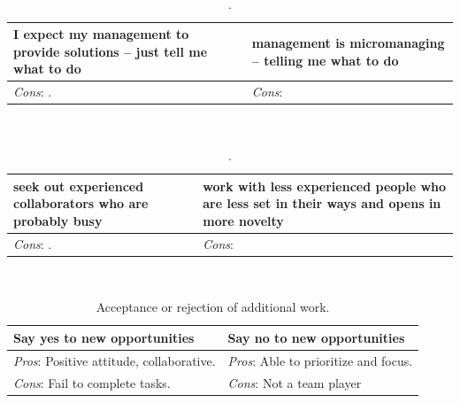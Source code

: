 \ \\

\begin{center}
\begin{table}[ht]
\begin{tabular}{ | m{\dilemmatablewidth}| m{\dilemmatablewidth} | } 
  \hline
  \textbf{I expect my management to provide solutions -- just tell me what to do} & 
  \textbf{management is micromanaging -- telling me what to do} \\ 
  \hline
  \textit{Cons}: . &
  \textit{Cons}:  \\  
  \hline
\end{tabular}
\caption{.
}
\label{table:solution_provider}
\end{table}
\end{center}


\ \\

\begin{center}
\begin{table}[ht]
\begin{tabular}{ | m{\dilemmatablewidth}| m{\dilemmatablewidth} | } 
  \hline
  \textbf{seek out experienced collaborators who are probably busy} & 
  \textbf{work with less experienced people who are less set in their ways and opens in more novelty} \\ 
  \hline
  \textit{Cons}: . &
  \textit{Cons}:  \\  
  \hline
\end{tabular}
\caption{.
}
\label{table:experience}
\end{table}
\end{center}


\ \\

\begin{center}
\begin{table}[ht]
\begin{tabular}{ | m{\dilemmatablewidth}| m{\dilemmatablewidth} | } 
  \hline
  \textbf{Say yes to new opportunities} & 
  \textbf{Say no to new opportunities} \\ 
  \hline
  \textit{Pros}: Positive attitude, collaborative. &
  \textit{Pros}: Able to prioritize and focus. \\
  \hline
  \textit{Cons}: Fail to complete tasks. &
  \textit{Cons}: Not a team player \\  
  \hline
\end{tabular}
\caption{Acceptance or rejection of additional work.
}
\label{table:new-opportunties}
\end{table}
\end{center}

